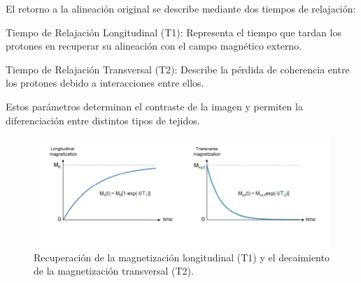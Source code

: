 





 

El retorno a la alineación original se describe mediante dos tiempos de relajación: 

Tiempo de Relajación Longitudinal (T1): Representa el tiempo que tardan los protones en recuperar su alineación con el campo magnético externo. 

Tiempo de Relajación Transversal (T2): Describe la pérdida de coherencia entre los protones debido a interacciones entre ellos. 

Estos parámetros determinan el contraste de la imagen y permiten la diferenciación entre distintos tipos de tejidos. 

\begin{figure}[hbtp]
  \includegraphics[width=\linewidth]{imagenes/Relaxation-rates-of-longitudinal-magnetization-1-T1-and-transverse-magnetization-1-T2.png}
  \caption{Recuperación de la magnetización longitudinal (T1) y el decaimiento de la magnetización transversal (T2).}
  \label{fig:T1yT2}
\end{figure}


